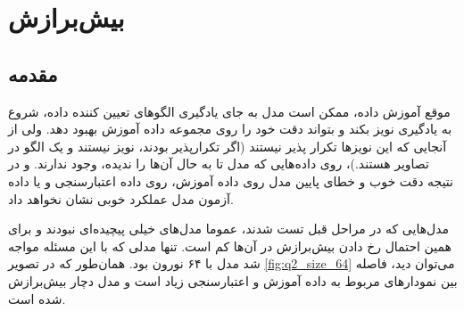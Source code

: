 \section{بیش‌برازش}
\subsection{مقدمه}
موقع آموزش داده، ممکن است مدل به جای یادگیری الگوهای تعیین کننده داده، شروع به یادگیری نویز بکند و بتواند دقت خود را روی مجموعه داده آموزش بهبود دهد. ولی از آنجایی که این نویزها تکرار پذیر نیستند (اگر تکرارپذیر بودند، نویز نیستند و یک الگو در تصاویر هستند.)، روی داده‌هایی که مدل تا به حال آن‌ها را ندیده، وجود ندارند. و در نتیجه  دقت خوب و خطای پایین مدل روی داده آموزش، روی داده اعتبارسنجی و یا داده آزمون مدل عملکرد خوبی نشان نخواهد داد.

مدل‌هایی که در مراحل قبل تست شدند، عموما مدل‌های خیلی پیچیده‌ای نبودند و برای همین احتمال رخ دادن بیش‌برازش در آن‌ها کم است. تنها مدلی که با این مسئله مواجه شد مدل با ۶۴ نورون بود. همان‌طور که در تصویر 
\ref{fig:q2_size_64}
می‌توان دید، فاصله بین نمودارهای مربوط به داده آموزش و اعتبارسنجی زیاد است و مدل دچار بیش‌برازش شده است. 

